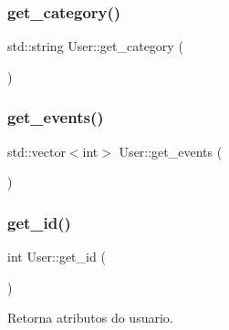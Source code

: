 \mbox{\label{class_user_af6e35d86fcb3d6211330dcaac643a4d8}} 
\subsubsection{\texorpdfstring{get\+\_\+category()}{get\_category()}}
{\footnotesize\ttfamily std\+::string User\+::get\+\_\+category (\begin{DoxyParamCaption}{ }\end{DoxyParamCaption})\hspace{0.3cm}{\ttfamily [inline]}}

\mbox{\label{class_user_ad6132e4432e0c58debd3b9adf1783e4d}} 
\subsubsection{\texorpdfstring{get\+\_\+events()}{get\_events()}}
{\footnotesize\ttfamily std\+::vector$<$int$>$ User\+::get\+\_\+events (\begin{DoxyParamCaption}{ }\end{DoxyParamCaption})\hspace{0.3cm}{\ttfamily [inline]}}

\mbox{\label{class_user_a323f47279e29843406052a19bb2bf629}} 
\subsubsection{\texorpdfstring{get\+\_\+id()}{get\_id()}}
{\footnotesize\ttfamily int User\+::get\+\_\+id (\begin{DoxyParamCaption}{ }\end{DoxyParamCaption})\hspace{0.3cm}{\ttfamily [inline]}}



Retorna atributos do usuario. 

\mbox{\label{class_user_a86c6040cbc76ac12c7f154b054bd1035}} 
